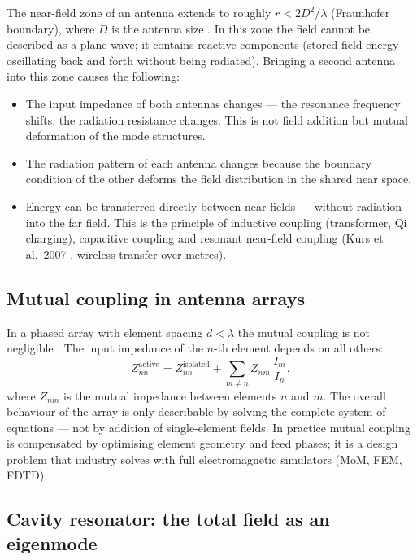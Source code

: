 The near-field zone of an antenna extends to roughly $r < 2D^2/\lambda$
(Fraunhofer boundary), where $D$ is the antenna size \EM. In this zone
the field cannot be described as a plane wave; it contains reactive
components (stored field energy oscillating back and forth without being
radiated). Bringing a second antenna into this zone causes the following:

\begin{itemize}[nosep]
\item The input impedance of both antennas changes --- the resonance
  frequency shifts, the radiation resistance changes. This is not field
  addition but mutual deformation of the mode structures.
\item The radiation pattern of each antenna changes because the boundary
  condition of the other deforms the field distribution in the shared
  near space.
\item Energy can be transferred directly between near fields --- without
  radiation into the far field. This is the principle of inductive coupling
  (transformer, Qi charging), capacitive coupling and resonant near-field
  coupling (Kurs et al.\ 2007 \cite{Kurs2007}, wireless transfer over metres).
\end{itemize}

\subsection*{Mutual coupling in antenna arrays}

In a phased array with element spacing $d < \lambda$ the mutual coupling
is not negligible \cite{Mailloux2017,Pozar2012}. The input impedance of the
$n$-th element depends on all others:
\[
  Z_{nn}^{\mathrm{active}} = Z_{nn}^{\mathrm{isolated}}
  + \sum_{m \neq n} Z_{nm}\,\frac{I_m}{I_n},
\]
where $Z_{nm}$ is the mutual impedance between elements $n$ and $m$. The
overall behaviour of the array is only describable by solving the complete
system of equations --- not by addition of single-element fields. In
practice mutual coupling is compensated by optimising element geometry and
feed phases; it is a design problem that industry solves with full
electromagnetic simulators (MoM, FEM, FDTD).

\subsection*{Cavity resonator: the total field as an eigenmode}

